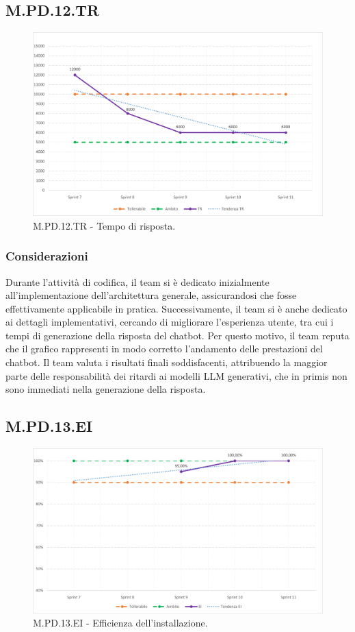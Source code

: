 \documentclass[10pt, a4paper]{article}
\begin{document}
\subsection{M.PD.12.TR}
\begin{figure}[H] \includegraphics[width=15.5cm]{img/metriche/MPD12TR.png} \caption{M.PD.12.TR - Tempo di risposta.} \end{figure} \subsubsection{Considerazioni}
Durante l'attività di codifica, il team si è dedicato inizialmente all'implementazione dell'architettura generale, assicurandosi che fosse effettivamente applicabile in pratica. Successivamente, il team si è anche dedicato ai dettagli implementativi, cercando di migliorare l'esperienza utente, tra cui i tempi di generazione della risposta del chatbot. Per questo motivo, il team reputa che il grafico rappresenti in modo corretto l'andamento delle prestazioni del chatbot. Il team valuta i risultati finali soddisfacenti, attribuendo la maggior parte delle responsabilità dei ritardi ai modelli LLM generativi, che in primis non sono immediati nella generazione della risposta.

\subsection{M.PD.13.EI}
\begin{figure}[H] \includegraphics[width=15.5cm]{img/metriche/MPD13EI.png} \caption{M.PD.13.EI - Efficienza dell’installazione.} \end{figure}
\end{document}
